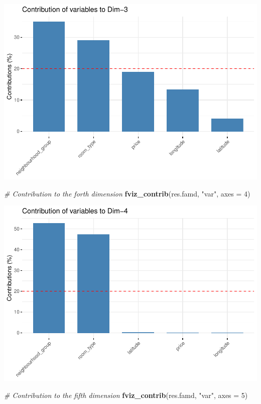 \documentclass[
]{article}
\newenvironment{Shaded}{\begin{snugshade}}{\end{snugshade}}
\newcommand{\CommentTok}[1]{\textcolor[rgb]{0.56,0.35,0.01}{\textit{#1}}}
\newcommand{\DataTypeTok}[1]{\textcolor[rgb]{0.13,0.29,0.53}{#1}}
\newcommand{\DecValTok}[1]{\textcolor[rgb]{0.00,0.00,0.81}{#1}}
\newcommand{\KeywordTok}[1]{\textcolor[rgb]{0.13,0.29,0.53}{\textbf{#1}}}
\newcommand{\NormalTok}[1]{#1}
\newcommand{\StringTok}[1]{\textcolor[rgb]{0.31,0.60,0.02}{#1}}
\begin{document}
\includegraphics{project-code_files/figure-latex/unnamed-chunk-37-4.pdf}

\begin{Shaded}
\begin{Highlighting}[]
\CommentTok{# Contribution to the forth dimension}
\KeywordTok{fviz_contrib}\NormalTok{(res.famd, }\StringTok{"var"}\NormalTok{, }\DataTypeTok{axes =} \DecValTok{4}\NormalTok{)}
\end{Highlighting}
\end{Shaded}

\includegraphics{project-code_files/figure-latex/unnamed-chunk-37-5.pdf}

\begin{Shaded}
\begin{Highlighting}[]
\CommentTok{# Contribution to the fifth dimension}
\KeywordTok{fviz_contrib}\NormalTok{(res.famd, }\StringTok{"var"}\NormalTok{, }\DataTypeTok{axes =} \DecValTok{5}\NormalTok{)}
\end{Highlighting}
\end{Shaded}
\end{document}

